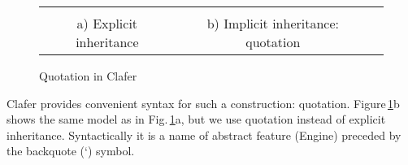 \documentclass{llncs}
\newcommand{\figref}[1]{Fig.\,\ref{fig:#1}}
\newcommand{\Figref}[1]{Figure\,\ref{fig:#1}}
\begin{document}
\begin{figure}[t]
  \begin{center}
    \begin{tabular}{ccc}
      \begin{minipage}[t]{3.5cm}
        \vspace{0pt}
        
      \end{minipage}
      &
      \begin{minipage}[t]{3.5cm}
        \vspace{0pt}
        
      \end{minipage}\\[0.2cm]
      a) Explicit inheritance & b) Implicit inheritance: quotation
    \end{tabular}
  \end{center}
  \caption{Quotation in Clafer\label{fig:qautofm}}
\end{figure}

Clafer provides convenient syntax for such a construction: quotation. \Figref{qautofm}b shows the same model as in \figref{qautofm}a, but we use quotation instead of explicit inheritance. Syntactically it is a name of abstract feature (\textsf{Engine}) preceded by the backquote (\textsf{`}) symbol.

\nocite{*}


\end{document}
